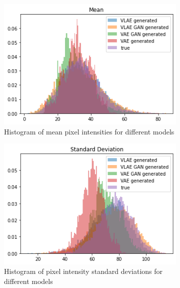 \begin{figure}
    \centering
    \begin{subfigure}{0.48\textwidth}
        \centering
        \includegraphics[width=\textwidth]{images/generated_vs_true/mnist_vs_models_mean.png}
        \caption{Histogram of mean pixel intensities for different models}
        \label{subfig:mean_generated_vs_true}
    \end{subfigure}
    \hfill
    \begin{subfigure}{0.48\textwidth}
        \centering
        \includegraphics[width=\textwidth]{images/generated_vs_true/mnist_vs_models_sd.png}
        \caption{Histogram of pixel intensity standard deviations for different models}
        \label{subfig:sd_generated_vs_true}
    \end{subfigure}
    \hfill
    \begin{subfigure}{0.48\textwidth}

\end{subfigure}
\end{figure}
